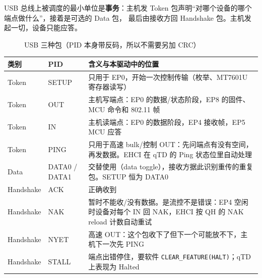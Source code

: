 \documentclass[UTF8,zihao=-4,fontset=none]{ctexart}
\newcommand{\fn}[1]{\texttt{#1}}
\begin{document}
USB 总线上被调度的最小单位是\textbf{事务}：主机发 Token 包声明“对哪个设备的哪个端点做什么”，接着是可选的 Data 包，
最后由接收方回 Handshake 包。主机发起一切，设备只能应答。

\begin{figure}[H]
\centering
{}
\caption{USB 三种包（PID 本身带反码，所以不需要另加 CRC）}
\end{figure}

\begin{longtable}{p{20mm}p{24mm}p{100mm}}
\toprule
类别 & PID & 含义与本驱动中的位置 \\ \midrule \endhead
Token & SETUP & 只用于 EP0，开始一次控制传输（枚举、MT7601U 寄存器读写） \\
Token & OUT & 主机写端点：EP0 的数据/状态阶段，EP8 的固件、MCU 命令和 802.11 帧 \\
Token & IN & 主机读端点：EP0 的数据阶段，EP4 接收帧，EP5 MCU 应答 \\
Token & PING & 只用于高速 bulk/控制 OUT：先问端点有没有空间，再发数据。EHCI 在 qTD 的 Ping 状态位里自动处理 \\
Data & DATA0 / DATA1 & 交替使用（data toggle），接收方据此识别重传的重复包。SETUP 恒为 DATA0 \\
Handshake & ACK & 正确收到 \\
Handshake & NAK & 暂时不能收/没有数据。是流控不是错误：EP4 空闲时设备对每个 IN 回 NAK，EHCI 按 QH 的 NAK reload 计数自动重试 \\
Handshake & NYET & 高速 OUT：这个包收下了但下一个可能放不下，主机下一次先 PING \\
Handshake & STALL & 端点出错停住，要软件 \fn{CLEAR\_FEATURE(HALT)}；qTD 上表现为 Halted \\
\bottomrule
\end{longtable}
\end{document}
